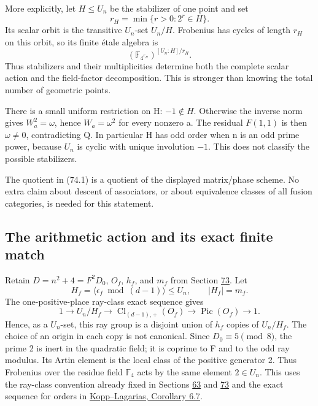 \documentclass[11pt,reqno]{amsart}
\theoremstyle{plain}
\begin{document}
More explicitly, let \(H\le U_n\) be the stabilizer of one point and set
\[
 r_H=\min\{r>0:2^r\in H\}.
\]
Its scalar orbit is the transitive \(U_n\)-set \(U_n/H\). Frobenius
has cycles of length \(r_H\) on this orbit, so its finite \'etale algebra is
\begin{equation*}
 \boxed{\left(\mathbb F_{4^{r_H}}\right)^{[U_n:H]/r_H}.}
 \tag{74.2}
\end{equation*}
Thus stabilizers and their multiplicities determine both the complete
scalar action and the field-factor decomposition. This is stronger than
knowing the total number of geometric points.

There is a small uniform restriction on H: \(-1\notin H\). Otherwise
the inverse norm gives \(W_a^2=\omega\), hence
\(W_a=\omega^2\) for every nonzero a. The residual \(F(1,1)\) is then
\(\omega\ne0\), contradicting Q. In particular H has odd order when
n is an odd prime power, because \(U_n\) is cyclic with unique involution
\(-1\). This does not classify the possible stabilizers.

The quotient in (74.1) is a quotient of the displayed matrix/phase
scheme. No extra claim about descent of associators, or about equivalence
classes of all fusion categories, is needed for this statement.

\subsection{The arithmetic action and its exact finite match}\label{sec:74.2}

Retain \(D=n^2+4=F^2D_0\), \(O_f\), \(h_f\), and \(m_f\) from
Section \hyperref[sec:73]{73}. Let
\[
 H_f=\langle\epsilon_f\bmod(d-1)\rangle\le U_n,
 \qquad |H_f|=m_f.
\]
The one-positive-place ray-class exact sequence gives
\begin{equation*}
 1\longrightarrow U_n/H_f
 \longrightarrow\operatorname{Cl}_{(d-1),+}(O_f)
 \longrightarrow\operatorname{Pic}(O_f)\longrightarrow1.
 \tag{74.3}
\end{equation*}
Hence, as a \(U_n\)-set, this ray group is a disjoint union of
\(h_f\) copies of \(U_n/H_f\). The choice of an origin in each copy
is not canonical. Since \(D_0\equiv5\pmod8\), the prime 2 is inert
in the quadratic field; it is coprime to F and to the odd ray modulus.
Its Artin element is the local class of the positive generator 2.
Thus Frobenius over the residue field \(\mathbb F_4\) acts by the same
element \(2\in U_n\). This uses the ray-class convention already fixed
in Sections \hyperref[sec:63]{63} and \hyperref[sec:73]{73} and the exact sequence for orders in
\href{https://arxiv.org/html/2212.09177v3\#S6.SS2}{Kopp--Lagarias, Corollary 6.7}.
\end{document}
